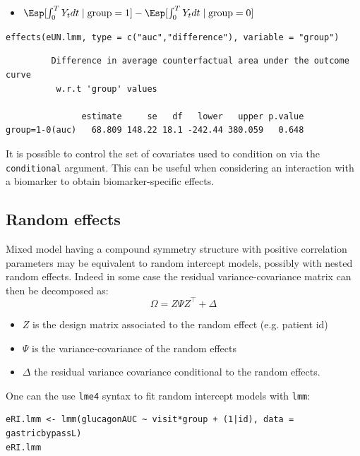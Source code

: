 \documentclass[12pt]{article}
\newcommand\trans[1]{{#1}^\intercal}%
\begin{document}
\begin{itemize}
\item \(\Esp[\int_0^T Y_t dt \mid \text{group}=1]-\Esp[\int_0^T Y_t dt \mid \text{group}=0]\)
\end{itemize}
\lstset{language=r,label= ,caption= ,captionpos=b,numbers=none}
\begin{lstlisting}
effects(eUN.lmm, type = c("auc","difference"), variable = "group")
\end{lstlisting}

\begin{verbatim}
	     Difference in average counterfactual area under the outcome curve
	      w.r.t 'group' values 

               estimate     se   df   lower   upper p.value  
group=1-0(auc)   68.809 148.22 18.1 -242.44 380.059   0.648
\end{verbatim}


It is possible to control the set of covariates used to condition on
via the \texttt{conditional} argument. This can be useful when considering an
interaction with a biomarker to obtain biomarker-specific effects.

\clearpage

\subsection{Random effects}
\label{sec:orgf97f01f}

Mixed model having a compound symmetry structure with positive
correlation parameters may be equivalent to random intercept models,
possibly with nested random effects. Indeed in some case the residual
variance-covariance matrix can then be decomposed as:
\[ \Omega = Z \Psi \trans{Z} + \Delta \]
\begin{itemize}
\item \(Z\) is the design matrix associated to the random effect (e.g. patient id)
\item \(\Psi\) is the variance-covariance of the random effects
\item \(\Delta\) the residual variance covariance conditional to the random effects.
\end{itemize}
One can the use \texttt{lme4} syntax to fit random intercept models with
\texttt{lmm}:
\lstset{language=r,label= ,caption= ,captionpos=b,numbers=none}
\begin{lstlisting}
eRI.lmm <- lmm(glucagonAUC ~ visit*group + (1|id), data = gastricbypassL)
eRI.lmm
\end{lstlisting}
\end{document}
